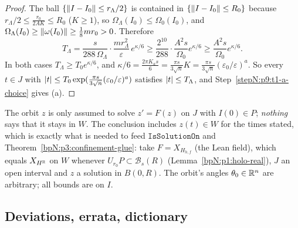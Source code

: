 \begin{proof}
The ball $\{\lVert I-I_0\rVert\le r_\Lambda/2\}$ is contained in $\{\lVert I-I_0\rVert\le R_0\}$ because $r_\Lambda/2\le\frac{r_0}{2AK}\le R_0$ ($K\ge1$), so $\Omega_\Lambda(I_0)\le\Omega_0(I_0)$, and $\Omega_\Lambda(I_0)\ge\lVert \omega(I_0)\rVert\ge\frac18mr_0>0$. Therefore
\[T_\Lambda=\frac{s}{288\,\Omega_\Lambda}\cdot\frac{mr_\Lambda^2}\varepsilon\,e^{\kappa/6}\ge\frac{2^{10}}{288}\cdot\frac{A^2s}{\Omega_0}e^{\kappa/6}\ge\frac{A^2s}{\Omega_0}e^{\kappa/6}.\]
\label{stepN:p9:t1-a-concl} In both cases $T_\Lambda\ge T_0e^{\kappa/6}$, and $\kappa/6=\frac{2\pi K_as}6=\frac{\pi s}{3\sqrt n}K=\frac{\pi s}{3\sqrt n}(\varepsilon_0/\varepsilon)^a$. So every $t\in J$ with $\lvert t\rvert\le T_0\exp(\frac{\pi s}{3\sqrt n}(\varepsilon_0/\varepsilon)^a)$ satisfies $\lvert t\rvert\le T_\Lambda$, and Step~\ref{stepN:p9:t1-a-choice} gives (a).
\end{proof}

\begin{remark}\label{bpN:p9:stopped}
The orbit $z$ is only assumed to solve $z'=F(z)$ on $J$ with $I(0)\in P$; \emph{nothing} says that it stays in $W$. The conclusion includes $z(t)\in W$ for the times stated, which is exactly what is needed to feed $\texttt{IsSolutionOn}$ and Theorem~\ref{bpN:p3:confinement-glue}: take $F=X_{H_{h,f}}$ (the Lean field), which equals $X_{H^{\mathbb{R}}}$ on $W$ whenever $U_{r_0}P\subset\mathcal B_s(R)$ (Lemma~\ref{bpN:p1:holo-real}), $J$ an open interval and $z$ a solution in $B(0,R)$. The orbit's angles $\theta_0\in\mathbb{R}^n$ are arbitrary; all bounds are on $I$.
\end{remark}

\subsection{Deviations, errata, dictionary}\label{bpN:p9:s-errata}

